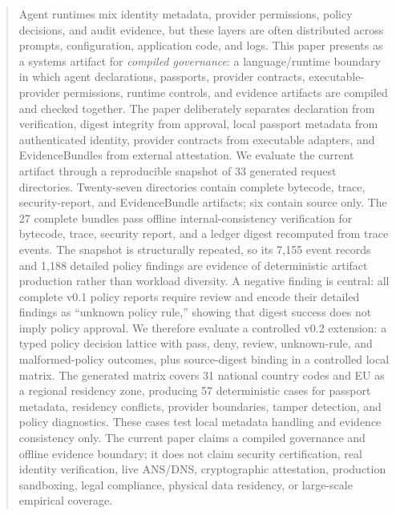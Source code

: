 \begin{abstract}
Agent runtimes mix identity metadata, provider permissions, policy decisions,
and audit evidence, but these layers are often distributed across prompts,
configuration, application code, and logs.  This paper presents \Argorix as a
systems artifact for \emph{compiled governance}: a language/runtime boundary in
which agent declarations, passports, provider contracts, executable-provider
permissions, runtime controls, and evidence artifacts are compiled and checked
together.  The paper deliberately separates declaration from verification,
digest integrity from approval, local passport metadata from authenticated
identity, provider contracts from executable adapters, and EvidenceBundles from
external attestation.  We evaluate the current artifact through a reproducible
snapshot of 33 generated request directories.  Twenty-seven directories contain
complete bytecode, trace, security-report, and EvidenceBundle artifacts; six
contain source only.  The 27 complete bundles pass offline internal-consistency
verification for bytecode, trace, security report, and a ledger digest
recomputed from trace events.  The snapshot is structurally repeated, so its
7,155 event records and 1,188 detailed policy findings are evidence of
deterministic artifact production rather than workload diversity.  A negative
finding is central: all complete v0.1 policy reports require review and encode
their detailed findings as ``unknown policy rule,'' showing that digest success
does not imply policy approval.  We therefore evaluate a controlled v0.2
extension: a typed policy decision lattice with pass, deny, review,
unknown-rule, and malformed-policy outcomes, plus source-digest binding in a
controlled local matrix.  The generated matrix covers 31 national country codes
and EU as a regional residency zone, producing 57 deterministic cases for
passport metadata, residency conflicts, provider boundaries, tamper detection,
and policy diagnostics.  These cases test local metadata handling and evidence
consistency only.  The current paper claims a compiled governance and offline
evidence boundary; it does not claim security certification, real identity
verification, live ANS/DNS, cryptographic attestation, production sandboxing,
legal compliance, physical data residency, or large-scale empirical coverage.
\end{abstract}
